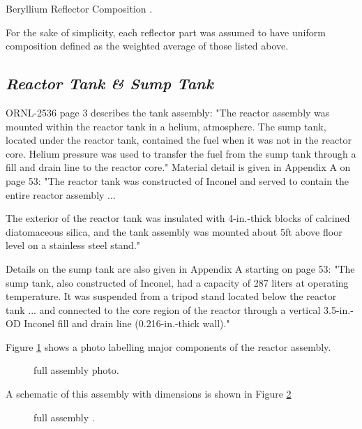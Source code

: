 \documentclass[ms,a4paper]{memoir}
\begin{document}
\begin{table}[H]
  \centering
  \caption{Beryllium Reflector Composition \parencite[Table 24]{ornl-2536}.}
  \label{tab11}
\end{table}

For the sake of simplicity, each reflector part was assumed to have uniform composition defined as the weighted average of those listed above.


\subsection{\emph{Reactor Tank \& Sump Tank}}

ORNL-2536 page 3 describes the tank assembly: "The reactor assembly was mounted within the reactor tank in a helium, atmosphere. The sump tank, located under the reactor tank, contained the fuel when it was not in the reactor core. Helium pressure was used to transfer the fuel from the sump tank through a fill and drain line to the reactor core." Material detail is given in Appendix A on page 53: "The reactor tank was constructed of Inconel and served to contain the entire reactor assembly ...

The exterior of the reactor tank was insulated with 4-in.-thick blocks of calcined diatomaceous silica, and the tank assembly was mounted about 5ft above floor level on a stainless steel stand."

Details on the sump tank are also given in Appendix A starting on page 53: "The sump tank, also constructed of Inconel, had a capacity of 287 liters at operating temperature. It was suspended from a tripod stand located below the reactor tank ... and connected to the core region of the reactor through a vertical 3.5-in.-OD Inconel fill and drain line (0.216-in.-thick wall)."

Figure \ref{fig4} shows a photo labelling major components of the reactor assembly.

\begin{figure}[H]
  \centering
  \caption{full assembly photo\parencite[Figure 6]{ornl-2536}.}
  \label{fig4}
\end{figure}

A schematic of this assembly with dimensions is shown in Figure \ref{fig5}

\begin{figure}[H]
  \centering
  \caption{full assembly \parencite[Figure 23]{ornl-2536}.}
  \label{fig5}
\end{figure}
\end{document}
